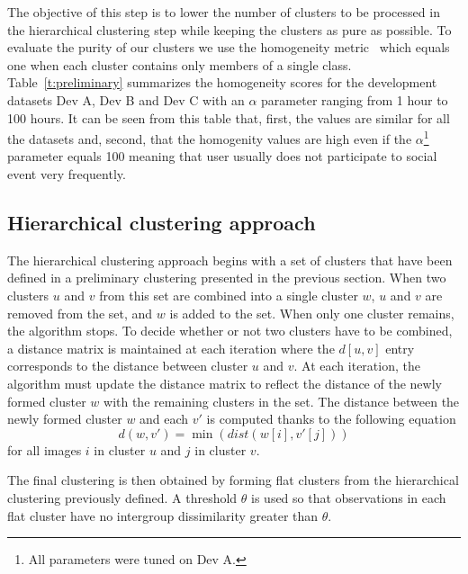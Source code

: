 \documentclass{acm_proc_article-me11_tweaked}
\begin{document}
The objective of this step is to lower the number of clusters to be processed in the hierarchical clustering step while keeping the clusters as pure as possible. To evaluate the purity of our clusters we use the homogeneity metric~\cite{rosenberg2007v} which equals one when each cluster contains only members of a single class. Table~\ref{t:preliminary} summarizes the homogeneity scores for the development datasets Dev A, Dev B and Dev C with an $\alpha$ parameter ranging from 1 hour to 100 hours. It can be seen from this table that, first, the values are similar for all the datasets and, second, that the homogenity values are high even if the $\alpha$\footnote{All parameters were tuned on Dev A.} parameter equals 100 meaning that user usually does not participate to social event very frequently. 

\subsection{Hierarchical clustering approach}\label{HC}

The hierarchical clustering approach begins with a set of clusters that have been defined in a preliminary clustering presented in the previous section. When two clusters $u$ and $v$ from this set are combined into a single cluster $w$, $u$ and $v$ are removed from the set, and $w$ is added to the set. When only one cluster remains, the algorithm stops.
To decide whether or not two clusters have to be combined, a distance matrix is maintained at each iteration where the $d[u,v]$ entry corresponds to the distance between cluster $u$ and $v$.
At each iteration, the algorithm must update the distance matrix to reflect the distance of the newly formed cluster $w$ with the remaining clusters in the set.
The distance between the newly formed cluster $w$ and each $v'$ is computed thanks to the following equation
\begin{equation}
d(w,v') = \min(dist(w[i],v'[j]))
\end{equation}
for all images $i$ in cluster $u$ and $j$ in cluster $v$.

The final clustering is then obtained by forming flat clusters from the hierarchical clustering previously defined. A threshold $\theta$ is used so that observations in each flat cluster have no intergroup dissimilarity greater than $\theta$.

%
%
%
%
\end{document}
